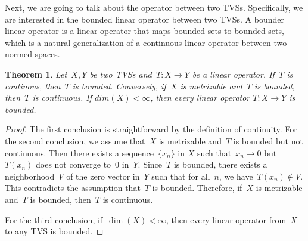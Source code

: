 \documentclass[12pt,a4paper,draft]{article}  %
\newtheorem{theorem}{Theorem}[section]
\theoremstyle{definition}
\numberwithin{equation}{section}
\begin{document}
Next, we are going to talk about the operator between two TVSs.
Specifically, we are interested in the bounded linear operator between two TVSs.
A bounder linear operator is a linear operator that maps bounded sets to bounded sets, 
which is a natural generalization of a continuous linear operator between two normed spaces.

\begin{theorem}
    Let~$X,Y$ be two TVSs and~$T: X \rightarrow Y$ be a linear operator.
    If~$T$ is continous, then~$T$ is bounded.
    Conversely, if~$X$ is metrizable and~$T$ is bounded, then~$T$ is continuous.
    If $dim(X) < \infty$, then every linear operator $T: X \rightarrow Y$ is bounded.
\end{theorem}
\begin{proof}
    The first conclusion is straightforward by the definition of continuity.
    For the second conclusion, we assume that~$X$ is metrizable and~$T$ is bounded but not continuous.
    Then there exists a sequence~$\{x_n\}$ in $X$ such that~$x_n \rightarrow 0$ but~$T(x_n)$ does not converge to~$0$ in~$Y$.
    Since~$T$ is bounded, there exists a neighborhood~$V$ of the zero vector in~$Y$ such that for all~$n$, we have~$T(x_n) \notin V$. 
    This contradicts the assumption that~$T$ is bounded.
    Therefore, if~$X$ is metrizable and~$T$ is bounded, then~$T$ is continuous.

    For the third conclusion, if~$\dim(X) < \infty$, then every linear operator from~$X$ to any TVS is bounded.
\end{proof}
\end{document}
